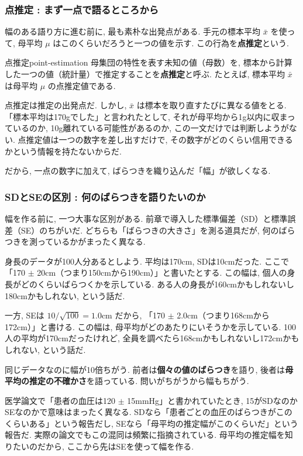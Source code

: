 \subsubsection{点推定 : まず一点で語るところから}

幅のある語り方に進む前に, 最も素朴な出発点がある.
手元の標本平均 $\bar{x}$ を使って, 母平均 $\mu$ はこのくらいだろうと一つの値を示す.
この行為を\textbf{点推定}という.

\begin{defi}{点推定}{point-estimation}
母集団の特性を表す未知の値（母数）を, 標本から計算した一つの値（統計量）で推定することを\textbf{点推定}と呼ぶ.
たとえば, 標本平均 $\bar{x}$ は母平均 $\mu$ の点推定値である.
\end{defi}

点推定は推定の出発点だ.
しかし, $\bar{x}$ は標本を取り直すたびに異なる値をとる.
「標本平均は170gでした」と言われたとして, それが母平均から1g以内に収まっているのか, 10g離れている可能性があるのか, この一文だけでは判断しようがない.
点推定値は一つの数字を差し出すだけで, その数字がどのくらい信用できるかという情報を持たないからだ.

だから, 一点の数字に加えて, ばらつきを織り込んだ「幅」が欲しくなる.

\subsubsection{SDとSEの区別 : 何のばらつきを語りたいのか}

幅を作る前に, 一つ大事な区別がある.
前章で導入した標準偏差（SD）と標準誤差（SE）のちがいだ.
どちらも「ばらつきの大きさ」を測る道具だが, 何のばらつきを測っているかがまったく異なる.

身長のデータが100人分あるとしよう.
平均は170cm, SDは10cmだった.
ここで「170 $\pm$ 20cm（つまり150cmから190cm）」と書いたとする.
この幅は, 個人の身長がどのくらいばらつくかを示している.
ある人の身長が160cmかもしれないし180cmかもしれない, という話だ.

一方, SEは $10 / \sqrt{100} = 1.0$cm だから, 「170 $\pm$ 2.0cm（つまり168cmから172cm）」と書ける.
この幅は, 母平均がどのあたりにいそうかを示している.
100人の平均が170cmだったけれど, 全員を調べたら168cmかもしれないし172cmかもしれない, という話だ.

同じデータなのに幅が10倍ちがう.
前者は\textbf{個々の値のばらつき}を語り, 後者は\textbf{母平均の推定の不確かさ}を語っている.
問いがちがうから幅もちがう.

医学論文で「患者の血圧は120 $\pm$ 15mmHg」と書かれていたとき, 15がSDなのかSEなのかで意味はまったく異なる.
SDなら「患者ごとの血圧のばらつきがこのくらいある」という報告だし, SEなら「母平均の推定幅がこのくらいだ」という報告だ.
実際の論文でもこの混同は頻繁に指摘されている.
母平均の推定幅を知りたいのだから, ここから先はSEを使って幅を作る.

